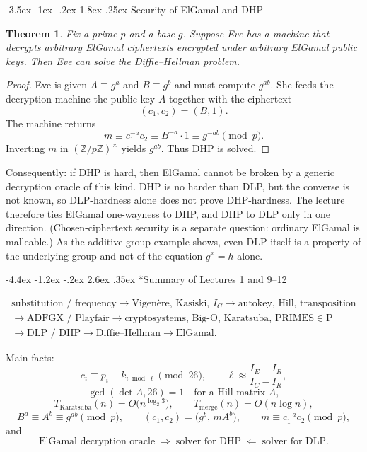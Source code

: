 \documentclass[11pt]{article}
\makeatletter
\renewcommand{\section}{\@startsection{section}{1}{\z@}%
    {-4.4ex \@plus -1.2ex \@minus -.2ex}%
    {2.6ex \@plus .35ex}%
    {\normalfont\Large\bfseries}}
\renewcommand{\subsection}{\@startsection{subsection}{2}{\z@}%
    {-3.5ex \@plus -1ex \@minus -.2ex}%
    {1.8ex \@plus .25ex}%
    {\normalfont\large\bfseries}}
\newtheorem{theorem}{Theorem}[section]
\theoremstyle{remark}
\DeclareMathOperator{\gcdop}{gcd}
\newcommand{\units}[1]{\left(\mathbb Z/#1\mathbb Z\right)^\times}
\makeatother
\begin{document}
\subsection{Security of ElGamal and DHP}

\begin{theorem}
Fix a prime $p$ and a base $g$. Suppose Eve has a machine that decrypts
arbitrary ElGamal ciphertexts encrypted under arbitrary ElGamal public
keys. Then Eve can solve the Diffie--Hellman problem.
\end{theorem}

\begin{proof}
Eve is given $A\equiv g^a$ and $B\equiv g^b$ and must compute $g^{ab}$.
She feeds the decryption machine the public key $A$ together with the
ciphertext
\[
    (c_1,c_2)=(B,1).
\]
The machine returns
\[
    m \equiv c_1^{-a} c_2 \equiv B^{-a}\cdot 1 \equiv g^{-ab}\pmod{p}.
\]
Inverting $m$ in $\units{p}$ yields $g^{ab}$. Thus DHP is solved.
\end{proof}

Consequently: if DHP is hard, then ElGamal cannot be broken by a generic
decryption oracle of this kind. DHP is no harder than DLP, but the
converse is not known, so DLP-hardness alone does not prove DHP-hardness.
The lecture therefore ties ElGamal one-wayness to DHP, and DHP to DLP
only in one direction. (Chosen-ciphertext security is a separate
question: ordinary ElGamal is malleable.) As the additive-group example
shows, even DLP itself is a property of the underlying group and not of
the equation $g^x=h$ alone.

\clearpage
{}
{}
\section*{Summary of Lectures 1 and 9--12}
\vspace{0.4em}

\[
\boxed{
\begin{array}{c}
\text{substitution / frequency}
\longrightarrow
\text{Vigen\`ere, Kasiski, }I_C
\longrightarrow
\text{autokey, Hill, transposition}
\\[4pt]
\longrightarrow
\text{ADFGX / Playfair}
\longrightarrow
\text{cryptosystems, Big-O, Karatsuba, PRIMES}\in\mathrm{P}
\\[4pt]
\longrightarrow
\text{DLP / DHP}
\longrightarrow
\text{Diffie--Hellman}
\longrightarrow
\text{ElGamal}.
\end{array}
}
\]

Main facts:
\[
    c_i \equiv p_i + k_{i\bmod \ell} \pmod{26},
    \qquad
    \ell \approx \frac{I_E-I_R}{I_C-I_R},
\]
\[
    \gcdop(\det A,26)=1
    \quad\text{for a Hill matrix }A,
\]
\[
    T_{\mathrm{Karatsuba}}(n)=O\bigl(n^{\log_2 3}\bigr),
    \qquad
    T_{\mathrm{merge}}(n)=O(n\log n),
\]
\[
    B^a \equiv A^b \equiv g^{ab}\pmod{p},
    \qquad
    (c_1,c_2)=\bigl(g^b,\, m A^b\bigr),
    \qquad
    m \equiv c_1^{-a} c_2 \pmod{p},
\]
and
\[
    \text{ElGamal decryption oracle}
    \;\Longrightarrow\;
    \text{solver for DHP}
    \;\Longleftarrow\;
    \text{solver for DLP}.
\]
\end{document}
